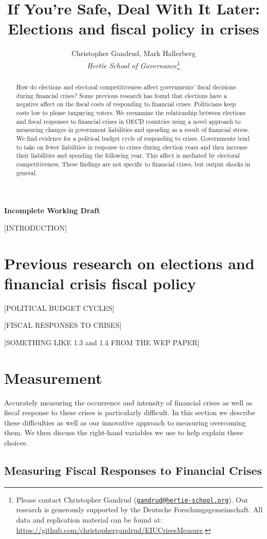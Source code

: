 \documentclass[]{article}
\title{If You're Safe, Deal With It Later: Elections and fiscal policy in crises}
\author{Christopher Gandrud, Mark Hallerberg \\ \emph{Hertie School of Governance}\footnote{Please contact Christopher Gandrud
(\href{mailto:gandrud@hertie-school.org}{\nolinkurl{gandrud@hertie-school.org}}).
Our research is generously supported by the Deutsche Forschungsgemeinschaft.
All data and replication material can be found at:
\url{https://github.com/christophergandrud/EIUCrisesMeasure}.}}
\begin{document}
\maketitle


\textbf{Incomplete Working Draft}

\begin{abstract}
How do elections and electoral competitiveness affect governments' fiscal decisions during financial crises? Some previous research has found that elections have a negative affect on the fiscal costs of responding to financial crises. Politicians keep costs low to please taxpaying voters. We reexamine the relationship between elections and fiscal responses to financial crises in OECD countries using a novel approach to measuring changes in government liabilities and spending as a result of financial stress. We find evidence for a political budget cycle of responding to crises. Governments tend to take on fewer liabilities in response to crises during election years and then increase their liabilities and spending the following year. This affect is mediated by electoral competitiveness. These findings are not specific to financial crises, but output shocks in general.

\end{abstract}

[INTRODUCTION]

\section{Previous research on elections and financial crisis fiscal policy}

[POLITICAL BUDGET CYCLES]

[FISCAL RESPONSES TO CRISES]

[SOMETHING LIKE 1.3 and 1.4 FROM THE WEP PAPER]

\section{Measurement}

Accurately measuring the occurrence and intensity of financial crises as well as fiscal response to these crises is particularly difficult. In this section we describe these difficulties as well as our innovative approach to measuring overcoming them. We then discuss the right-hand variables we use to help explain these choices.

\subsection*{Measuring Fiscal Responses to Financial Crises}
\end{document}
